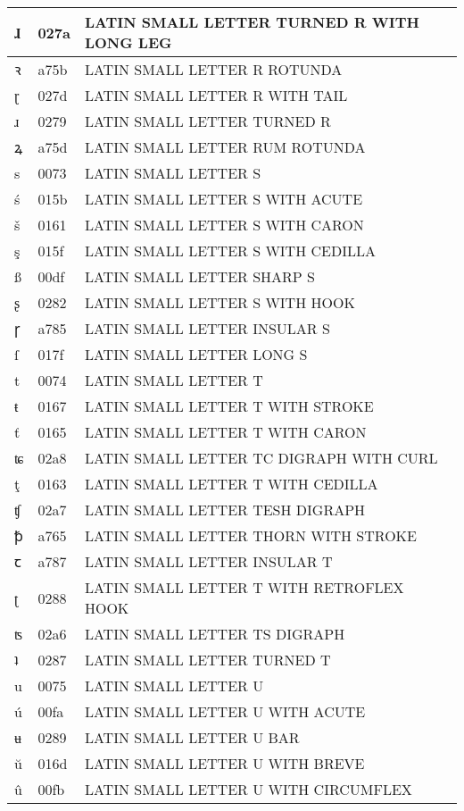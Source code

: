 \documentclass[12pt,letterpaper,openany]{book}
\begin{document}
\begin{center}
\begin{supertabular}{|m{0.25in}|m{0.5in}|m{4in}|}
ɺ & 027a & LATIN SMALL LETTER TURNED R WITH LONG LEG\\\hline
ꝛ & a75b & LATIN SMALL LETTER R ROTUNDA\\\hline
ɽ & 027d & LATIN SMALL LETTER R WITH TAIL\\\hline
ɹ & 0279 & LATIN SMALL LETTER TURNED R\\\hline
ꝝ & a75d & LATIN SMALL LETTER RUM ROTUNDA\\\hline
s & 0073 & LATIN SMALL LETTER S\\\hline
ś & 015b & LATIN SMALL LETTER S WITH ACUTE\\\hline
š & 0161 & LATIN SMALL LETTER S WITH CARON\\\hline
ş & 015f & LATIN SMALL LETTER S WITH CEDILLA\\\hline
ß & 00df & LATIN SMALL LETTER SHARP S\\\hline
ʂ & 0282 & LATIN SMALL LETTER S WITH HOOK\\\hline
ꞅ & a785 & LATIN SMALL LETTER INSULAR S\\\hline
ſ & 017f & LATIN SMALL LETTER LONG S\\\hline
t & 0074 & LATIN SMALL LETTER T\\\hline
ŧ & 0167 & LATIN SMALL LETTER T WITH STROKE\\\hline
ť & 0165 & LATIN SMALL LETTER T WITH CARON\\\hline
ʨ & 02a8 & LATIN SMALL LETTER TC DIGRAPH WITH CURL\\\hline
ţ & 0163 & LATIN SMALL LETTER T WITH CEDILLA\\\hline
ʧ & 02a7 & LATIN SMALL LETTER TESH DIGRAPH\\\hline
ꝥ & a765 & LATIN SMALL LETTER THORN WITH STROKE\\\hline
ꞇ & a787 & LATIN SMALL LETTER INSULAR T\\\hline
ʈ & 0288 & LATIN SMALL LETTER T WITH RETROFLEX HOOK\\\hline
ʦ & 02a6 & LATIN SMALL LETTER TS DIGRAPH\\\hline
ʇ & 0287 & LATIN SMALL LETTER TURNED T\\\hline
u & 0075 & LATIN SMALL LETTER U\\\hline
ú & 00fa & LATIN SMALL LETTER U WITH ACUTE\\\hline
ʉ & 0289 & LATIN SMALL LETTER U BAR\\\hline
ŭ & 016d & LATIN SMALL LETTER U WITH BREVE\\\hline
û & 00fb & LATIN SMALL LETTER U WITH CIRCUMFLEX\\\hline

\end{supertabular}
\end{center}
\end{document}
